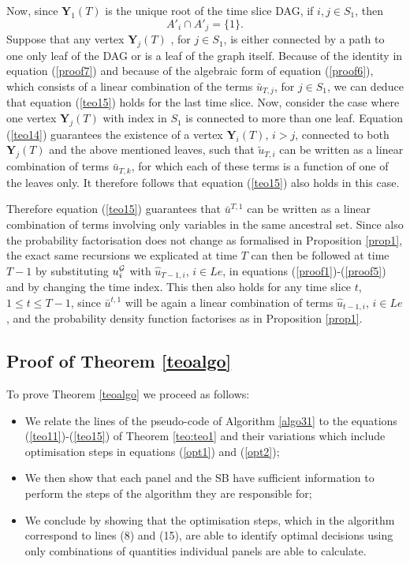 Now, since $\bm{Y}_1(T)$ is the unique root of the time slice DAG, if $i,j\in S_1$, then 
\begin{equation}
\label{proof7}
A'_i\cap A'_j =\{1\}.
\end{equation}
 Suppose that any vertex $\bm{Y}_j(T)$ , for $j\in S_1$, is either connected by a path to one only leaf of the DAG or is a leaf of the graph itself. Because of the identity in equation (\ref{proof7}) and because of the algebraic form of equation (\ref{proof6}), which consists of a linear combination of the terms $\bar{u}_{T,j}$, for $j\in S_1$,  we can deduce that equation (\ref{teo15}) holds for the last time slice. Now, consider the case where one vertex $\bm{Y}_j(T)$ with index in $S_1$ is connected to more than one leaf. Equation (\ref{teo14}) guarantees the existence of a vertex $\bm{Y}_i(T)$, $i>j$, connected to both $\bm{Y}_j(T)$ and the above mentioned leaves, such that $\tilde{u}_{T,i}$ can be written as a linear combination of  terms $\bar{u}_{T,k}$, for which each of these terms is a function of one of the leaves only. It therefore follows that equation (\ref{teo15}) also holds  in this case.

Therefore equation (\ref{teo15}) guarantees that $\bar{u}^{T,1}$ can be written as a linear combination of terms involving only variables in the same ancestral set. Since also the probability factorisation does not change as formalised in Proposition \ref{prop1}, the exact same recursions we explicated at time $T$ can then be followed at time $T-1$ by substituting $u^{\mathcal{G}}_i$ with $\hat{u}_{T-1,i}$, $i\in Le$, in equations (\ref{proof1})-(\ref{proof5}) and by changing the time index.  This then also holds for any time slice $t$, $1\leq t\leq T-1$, since $\bar{u}^{t,1}$ will be again a linear combination of terms $\hat{u}_{t-1,i}$, $i\in Le$, and the probability density function factorises as in Proposition \ref{prop1}.

\subsection{Proof of Theorem \ref{teoalgo}}
\label{prooftwo}
To prove Theorem \ref{teoalgo} we proceed as follows:
\begin{itemize}
\item We relate the lines of the pseudo-code of Algorithm \ref{algo31} to the equations (\ref{teo11})-(\ref{teo15}) of Theorem \ref{teo:teo1} and their variations which include optimisation steps in equations (\ref{opt1}) and (\ref{opt2});
\item We then show that each panel and the SB have sufficient information to perform the steps of the algorithm they are responsible for;
\item We conclude by showing that the optimisation steps, which in the algorithm correspond to lines (8) and (15), are able to identify optimal decisions using only combinations of quantities individual panels are able to calculate.
\end{itemize}

